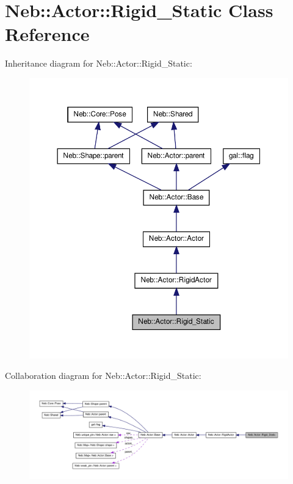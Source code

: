 \hypertarget{classNeb_1_1Actor_1_1Rigid__Static}{\section{\-Neb\-:\-:\-Actor\-:\-:\-Rigid\-\_\-\-Static \-Class \-Reference}
\label{classNeb_1_1Actor_1_1Rigid__Static}
}


\-Inheritance diagram for \-Neb\-:\-:\-Actor\-:\-:\-Rigid\-\_\-\-Static\-:
\nopagebreak
\begin{figure}[H]
\begin{center}
\leavevmode
\includegraphics[width=350pt]{classNeb_1_1Actor_1_1Rigid__Static__inherit__graph}
\end{center}
\end{figure}


\-Collaboration diagram for \-Neb\-:\-:\-Actor\-:\-:\-Rigid\-\_\-\-Static\-:
\nopagebreak
\begin{figure}[H]
\begin{center}
\leavevmode
\includegraphics[width=350pt]{classNeb_1_1Actor_1_1Rigid__Static__coll__graph}
\end{center}
\end{figure}
